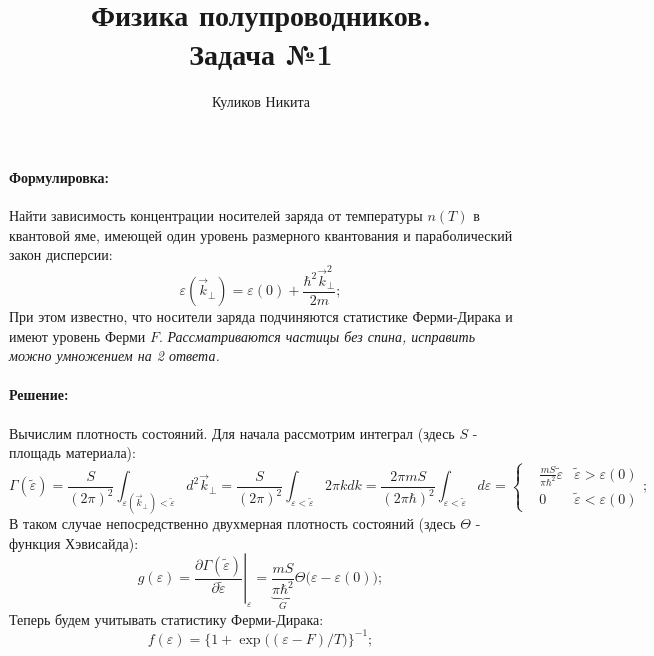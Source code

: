 \documentclass[a4paper, 14pt, russian]{article}
\title{Физика полупроводников.\\
        Задача №1}
\author{Куликов Никита}
\date{}
\newcommand{\pa}{\partial}
\newcommand{\vep}{\varepsilon}
\begin{document}
    \maketitle

    \paragraph{Формулировка:} Найти зависимость концентрации
        носителей заряда от температуры $n(T)$ в квантовой яме, имеющей 
        один уровень размерного квантования и параболический закон
        дисперсии:
        \begin{equation}
            \vep(\vec{k}_\perp) = \vep(0) + \frac{\hbar^2 \vec{k}_\perp^2}{2m};
        \end{equation}
        При этом известно, что носители заряда подчиняются статистике
        Ферми-Дирака и имеют уровень Ферми $F$. \textit{Рассматриваются частицы без спина,
        исправить можно умножением на 2 ответа.}

    \paragraph{Решение:} Вычислим плотность состояний. Для начала рассмотрим
        интеграл (здесь $S$ - площадь материала):
        \begin{equation}
            \Gamma (\tilde \vep) = \frac{S}{(2 \pi)^2} \int_{\vep(\vec{k}_\perp) < \tilde \vep} 
                d^2 \vec{k}_\perp = \frac{S}{(2 \pi)^2}
                \int_{\vep < \tilde \vep} 2 \pi k dk = 
                \frac{2 \pi m S}{(2 \pi \hbar)^2} \int_{\vep < \tilde \vep} 
                d\vep = 
                \left\{\begin{aligned}
                    &  \frac{m S}{\pi \hbar^2} \tilde \vep & \tilde \vep > \vep(0)\\
                    &  0                                 & \tilde \vep < \vep(0)
                \end{aligned}\right.;
        \end{equation}
        В таком случае непосредственно двухмерная плотность состояний (здесь $\Theta$ - функция Хэвисайда):
        \begin{equation}
            g(\vep) = \left. \frac{\pa \Gamma(\tilde \vep)}{\pa \tilde \vep} \right\rvert_{\vep}
                = \underbrace{\frac{mS}{\pi \hbar^2}}_{G} \Theta\big(\vep - \vep(0)\big); 
        \end{equation}
        Теперь будем учитывать статистику Ферми-Дирака:
        \begin{equation}
            f(\vep) = \Big\{1 + \exp\big((\vep - F) / T\big)\Big\}^{-1};
        \end{equation}
\end{document}
